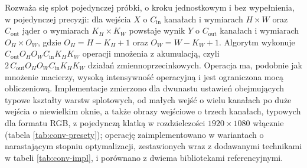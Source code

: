 \documentclass[a4paper,12pt]{book} %
\begin{document}
Rozważa się splot pojedynczej próbki, o kroku jednostkowym i bez wypełnienia, w pojedynczej precyzji: dla wejścia $X$ o $C_{\mathrm{in}}$ kanałach i wymiarach $H \times W$ oraz $C_{\mathrm{out}}$ jąder o wymiarach $K_H \times K_W$ powstaje wynik $Y$ o $C_{\mathrm{out}}$ kanałach i wymiarach $O_H \times O_W$, gdzie $O_H = H - K_H + 1$ oraz $O_W = W - K_W + 1$. Algorytm wykonuje $C_{\mathrm{out}} O_H O_W C_{\mathrm{in}} K_H K_W$ operacji mnożenia z akumulacją, czyli $2\,C_{\mathrm{out}} O_H O_W C_{\mathrm{in}} K_H K_W$ działań zmiennoprzecinkowych. Operacja ma, podobnie jak mnożenie macierzy, wysoką intensywność operacyjną i jest ograniczona mocą obliczeniową. Implementacje zmierzono dla dwunastu ustawień obejmujących typowe kształty warstw splotowych, od małych wejść o wielu kanałach po duże wejścia o niewielkim oknie, a także obrazy wejściowe o trzech kanałach, typowych dla formatu RGB, z pojedynczą klatką w rozdzielczości $1920 \times 1080$ włącznie (tabela \ref{tab:conv-presety}); operację zaimplementowano w wariantach o narastającym stopniu optymalizacji, zestawionych wraz z dodawanymi technikami w tabeli \ref{tab:conv-impl}, i porównano z dwiema bibliotekami referencyjnymi.
\end{document}
